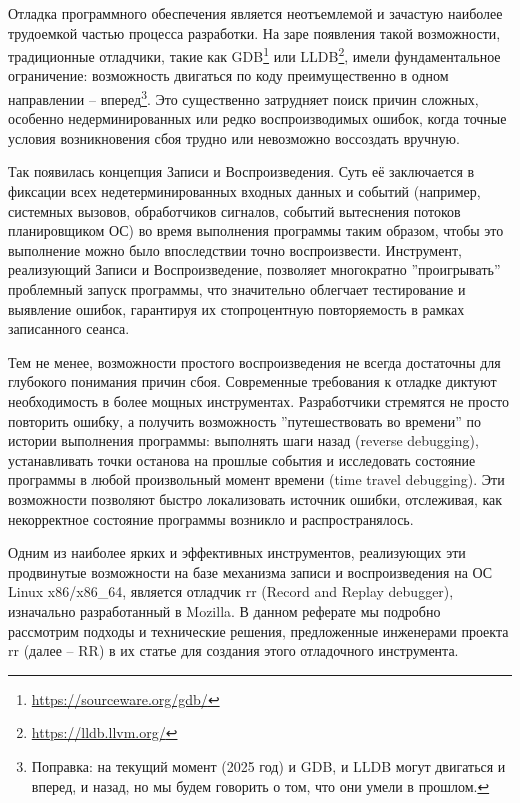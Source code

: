 


Отладка программного обеспечения является неотъемлемой и зачастую наиболее
трудоемкой частью процесса разработки. На заре появления такой возможности,
традиционные отладчики, такие как
GDB\footnote{\url{https://sourceware.org/gdb/}} или
LLDB\footnote{\url{https://lldb.llvm.org/}}, имели фундаментальное ограничение:
возможность двигаться по коду преимущественно в одном направлении –
вперед\footnote{Поправка: на текущий момент (2025 год) и GDB, и LLDB могут
двигаться и вперед, и назад, но мы будем говорить о том, что они умели в
прошлом.}. Это существенно затрудняет поиск причин сложных, особенно
недерминированных или редко воспроизводимых ошибок, когда точные условия
возникновения сбоя трудно или невозможно воссоздать вручную.

Так появилась концепция Записи и Воспроизведения. Суть её заключается в
фиксации всех недетерминированных входных данных и событий (например, системных
вызовов, обработчиков сигналов, событий вытеснения потоков планировщиком ОС) во
время выполнения программы таким образом, чтобы это выполнение можно было
впоследствии точно воспроизвести. Инструмент, реализующий Записи и
Воспроизведение, позволяет многократно ''проигрывать'' проблемный запуск
программы, что значительно облегчает тестирование и выявление ошибок,
гарантируя их стопроцентную повторяемость в рамках записанного сеанса.

Тем не менее, возможности простого воспроизведения не всегда достаточны для
глубокого понимания причин сбоя. Современные требования к отладке диктуют
необходимость в более мощных инструментах. Разработчики стремятся не просто
повторить ошибку, а получить возможность ''путешествовать во времени'' по истории
выполнения программы: выполнять шаги назад (reverse debugging), устанавливать
точки останова на прошлые события и исследовать состояние программы в любой
произвольный момент времени (time travel debugging). Эти возможности позволяют
быстро локализовать источник ошибки, отслеживая, как некорректное состояние
программы возникло и распространялось.

Одним из наиболее ярких и эффективных инструментов, реализующих эти продвинутые
возможности на базе механизма записи и воспроизведения на ОС Linux x86/x86\_64, является отладчик rr
(Record and Replay debugger), изначально разработанный в Mozilla. В данном
реферате мы подробно рассмотрим подходы и технические решения, предложенные
инженерами проекта rr (далее – RR) в их статье \cite{rr-paper}
для создания этого отладочного инструмента.